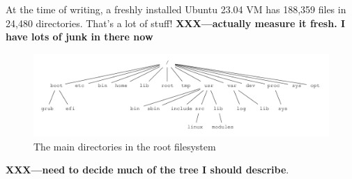 At the time of writing, a freshly installed Ubuntu 23.04 VM has 188,359 files in 24,480 directories. That's a lot of stuff! \textbf{XXX---actually measure it fresh. I have lots of junk in there now}

\begin{figure}
	\includegraphics[scale=0.6]{figures/fs-tree.pdf}
	\centering
	\caption{The main directories in the root filesystem}
	\label{fig:fs-tree}
\end{figure}

\textbf{XXX---need to decide much of the tree I should describe}.

